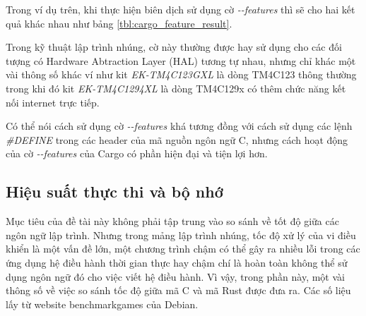 Trong ví dụ trên, khi thực hiện biên dịch sử dụng cờ \emph{-{}-features} thì sẽ cho hai kết quả khác nhau như bảng \ref{tbl:cargo_feature_result}.


Trong kỹ thuật lập trình nhúng, cờ này thường được hay sử dụng cho các đối tượng có Hardware Abtraction Layer (HAL) tương tự nhau, nhưng chỉ khác một vài thông số khác ví như kit \emph{EK-TM4C123GXL} là dòng TM4C123 thông thường trong khi đó kit \emph{EK-TM4C1294XL} là dòng TM4C129x có thêm chức năng kết nối internet trực tiếp.

Có thể nói cách sử dụng cờ \emph{-{}-features} khá tương đồng với cách sử dụng các lệnh \emph{\#DEFINE} trong các header của mã nguồn ngôn ngữ C, nhưng cách hoạt động của cờ \emph{-{}-features} của Cargo có phần hiện đại và tiện lợi hơn.

\subsection{Hiệu suất thực thi và bộ nhớ}\label{lbl:benchmarkgames}
Mục tiêu của đề tài này không phải tập trung vào so sánh về tốt độ giữa các ngôn ngữ lập trình.
Nhưng trong mảng lập trình nhúng, tốc độ xử lý của vi điều khiển là một vấn đề lớn, một chương trình chậm có thể gây ra nhiều lỗi trong các ứng dụng hệ điều hành thời gian thực hay chậm chí là hoàn toàn không thể sử dụng ngôn ngữ đó cho việc viết hệ điều hành.
Vì vậy, trong phần này, một vài thông số về việc so sánh tốc độ giữa mã C và mã Rust được đưa ra.
Các số liệu lấy từ website benchmarkgames của Debian.

